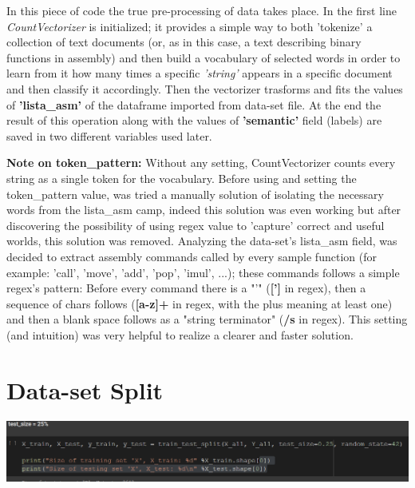 \documentclass[11pt]{scrartcl}
\begin{document}
\large{
In this piece of code the true pre-processing of data takes place. \newline
In the first line \textit{CountVectorizer} is initialized; it provides a simple way to both 'tokenize' a collection of text documents (or, as in this case, a text describing binary functions in assembly) and then build a vocabulary of selected words in order to learn from it how many times a specific \textit{'string'} appears in a specific document and then classify it accordingly. \newline
Then the vectorizer trasforms and fits the values of \textbf{'lista\_asm'} of the dataframe imported from data-set file. At the end the result of this operation along with the values of \textbf{'semantic'} field (labels) are saved in two different variables used later.

\vspace{0.5cm}

\noindent
\textbf{\large{Note on token\_pattern:}}\large{ \newline
Without any setting, CountVectorizer counts every string as a single token for the vocabulary. Before using and setting the token\_pattern value, was tried a manually solution of isolating the necessary words from the lista\_asm camp, indeed this solution was even working but after discovering the possibility of using regex value to 'capture' correct and useful worlds, this solution was removed. \newline
Analyzing the data-set's lista\_asm field, was decided to extract assembly commands called by every sample function (for example: 'call', 'move', 'add', 'pop', 'imul', ...); these commands follows a simple regex's pattern: \newline
Before every command there is a "'" (\textbf{[']} in regex), then a sequence of chars follows (\textbf{[a-z]+} in regex, with the plus meaning at least one) and then a blank space follows as a "string terminator" (\textbf{/s} in regex). \newline
This setting (and intuition) was very helpful to realize a clearer and faster solution.
}

\newpage
\section{Data-set Split}


\vspace{0.4cm}
\hspace{+0.2in}\includegraphics[width=1.0\textwidth]{split.png}
\vspace{0.3cm}

}
\end{document}
